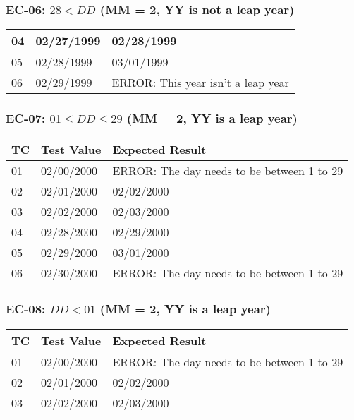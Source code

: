 \documentclass[11pt, oneside]{article}   	%
\begin{document}
\subsubsection{EC-06: $28 < DD$ (MM = 2, YY is not a leap year)}
\begin{table}[H]
\begin{tabular}{|l|l|l|}
\hline
04 & 02/27/1999 & 02/28/1999                                 \\ \hline
05 & 02/28/1999 & 03/01/1999                                 \\ \hline
06 & 02/29/1999 & ERROR: This year isn't a leap year         \\ \hline
\end{tabular}
\end{table}

\subsubsection{EC-07: $01 \leq DD \leq 29$ (MM = 2, YY is a leap year)}
\begin{table}[H]
\begin{tabular}{|l|l|l|}
\hline
TC & Test Value & Expected Result                            \\ \hline
01 & 02/00/2000 & ERROR: The day needs to be between 1 to 29 \\ \hline
02 & 02/01/2000 & 02/02/2000                                 \\ \hline
03 & 02/02/2000 & 02/03/2000                                 \\ \hline
04 & 02/28/2000 & 02/29/2000                                 \\ \hline
05 & 02/29/2000 & 03/01/2000                                 \\ \hline
06 & 02/30/2000 & ERROR: The day needs to be between 1 to 29 \\ \hline
\end{tabular}
\end{table}

\subsubsection{EC-08: $DD < 01$ (MM = 2, YY is a leap year)}
\begin{table}[H]
\begin{tabular}{|l|l|l|}
\hline
TC & Test Value & Expected Result                            \\ \hline
01 & 02/00/2000 & ERROR: The day needs to be between 1 to 29 \\ \hline
02 & 02/01/2000 & 02/02/2000                                 \\ \hline
03 & 02/02/2000 & 02/03/2000                                 \\ \hline
\end{tabular}
\end{table}
\end{document}
